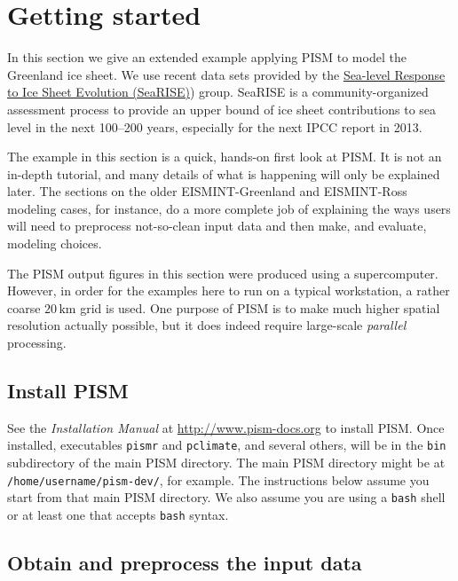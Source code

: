 
\section{Getting started}\label{sect:start}

In this section we give an extended example applying PISM to model the Greenland ice sheet.  We use recent data sets provided by the \href{http://websrv.cs.umt.edu/isis/index.php/SeaRISE_Assessment}{Sea-level Response to Ice Sheet Evolution (SeaRISE)}) group.  SeaRISE is a community-organized assessment process to provide an upper bound of ice sheet contributions to sea level in the next 100--200 years, especially for the next IPCC report in 2013.

The example in this section is a quick, hands-on first look at PISM.  It is not an in-depth tutorial, and many details of what is happening will only be explained later.  The sections on the older EISMINT-Greenland and EISMINT-Ross modeling cases, for instance, do a more complete job of explaining the ways users will need to preprocess not-so-clean input data and then make, and evaluate, modeling choices.

The PISM output figures in this section were produced using a supercomputer.  However, in order for the examples here to run on a typical workstation, a rather coarse $20\,\textrm{km}$ grid is used.  One purpose of PISM is to make much higher spatial resolution actually possible, but it does indeed require large-scale \emph{parallel} processing.


\subsection{Install PISM}

See the \emph{Installation Manual} at \url{http://www.pism-docs.org}
to install PISM.  Once installed, executables \texttt{pismr} and \texttt{pclimate}, and several others, will be in the \texttt{bin} subdirectory of the main PISM directory.  The main PISM directory might be at \texttt{/home/username/pism-dev/}, for example.  The instructions below assume you start from that main PISM directory.  We also assume you are using a \texttt{bash} shell or at least one that accepts \texttt{bash} syntax.


\subsection{Obtain and preprocess the input data}


